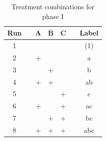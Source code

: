 \begin{table}[h]
\centering
\begin{tabular}{@{}clccclc@{}}
\toprule
\textbf{Run} &  & \textbf{A} & \textbf{B} & \textbf{C} &  & \textbf{Label} \\ \midrule
1            &  &            &            &            &  & (1)            \\
2            &  & +          &            &            &  & a              \\
3            &  &            & +          &            &  & b              \\
4            &  & +          & +          &            &  & ab             \\
5            &  &            &            & +          &  & c              \\
6            &  & +          &            & +          &  & ac             \\
7            &  &            & +          & +          &  & bc             \\
8            &  & +          & +          & +          &  & abc            \\ \bottomrule
\end{tabular}
\caption{Treatment combinations for phase I}
\label{tab:p1-runs}
\end{table}